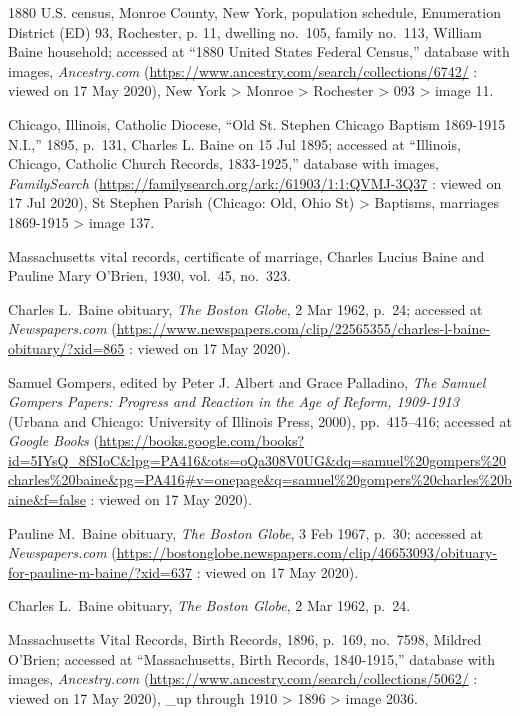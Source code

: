 \begin{thebibliography}{999}
1880 U.S. census, Monroe County, New York, population schedule, Enumeration District (ED) 93, Rochester, p. 11, dwelling no.\ 105, family no.\ 113, William Baine household; accessed at ``1880 United States Federal Census,'' database with images, \textit{Ancestry.com} (\url{https://www.ancestry.com/search/collections/6742/} : viewed on 17 May 2020), New York > Monroe > Rochester > 093 > image 11.

Chicago, Illinois, Catholic Diocese, ``Old St. Stephen Chicago Baptism 1869-1915 N.I.,'' 1895, p.\ 131, Charles L. Baine on 15 Jul 1895; accessed at ``Illinois, Chicago, Catholic Church Records, 1833-1925,'' database with images, \textit{FamilySearch} (\url{https://familysearch.org/ark:/61903/1:1:QVMJ-3Q37} : viewed on 17 Jul 2020), St Stephen Parish (Chicago: Old, Ohio St) > Baptisms, marriages 1869-1915 > image 137.

Massachusetts vital records, certificate of marriage, Charles Lucius Baine and Pauline Mary O'Brien, 1930, vol.\ 45, no.\ 323.

Charles L.\ Baine obituary, \textit{The Boston Globe}, 2 Mar 1962, p.\ 24; accessed at \textit{Newspapers.com} (\url{https://www.newspapers.com/clip/22565355/charles-l-baine-obituary/?xid=865} : viewed on 17 May 2020).

Samuel Gompers, edited by Peter J. Albert and Grace Palladino, \textit{The Samuel Gompers Papers: Progress and Reaction in the Age of Reform, 1909-1913} (Urbana and Chicago: University of Illinois Press, 2000), pp.\ 415--416; accessed at \textit{Google Books} (\url{https://books.google.com/books?id=5IYsQ\_8fSIoC\&lpg=PA416\&ots=oQa308V0UG\&dq=samuel\%20gompers\%20charles\%20baine\&pg=PA416\#v=onepage\&q=samuel\%20gompers\%20charles\%20baine\&f=false} : viewed on 17 May 2020).

Pauline M.\ Baine obituary, \textit{The Boston Globe}, 3 Feb 1967, p.\ 30; accessed at \textit{Newspapers.com} (\url{https://bostonglobe.newspapers.com/clip/46653093/obituary-for-pauline-m-baine/?xid=637} : viewed on 17 May 2020).

Charles L.\ Baine obituary, \textit{The Boston Globe}, 2 Mar 1962, p.\ 24.


Massachusetts Vital Records, Birth Records, 1896, p.\ 169, no.\ 7598, Mildred O'Brien; accessed at ``Massachusetts, Birth Records, 1840-1915,'' database with images, \textit{Ancestry.com} (\url{https://www.ancestry.com/search/collections/5062/} : viewed on 17 May 2020), \_up through 1910 > 1896 > image 2036.


\end{thebibliography}

